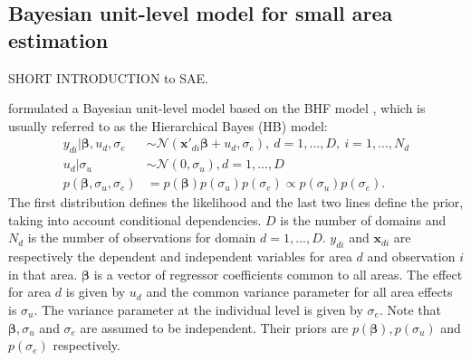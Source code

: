 \subsection{Bayesian unit-level model for small area estimation}

SHORT INTRODUCTION to SAE.    \cite{rao_small_2015}

\cite{molina_small_2014} formulated a Bayesian unit-level model based on the BHF model \citep{battese_error_1988}, which is usually referred to as the Hierarchical Bayes (HB) model:
\begin{equation}
    \label{eq:hb_rao}
	\begin{split}
	y_{di} |\boldsymbol \beta, u_d, \sigma_e & \sim \mathcal N(\boldsymbol{x'}_{di} \boldsymbol{\beta}+ u_d, \sigma_e),\ d = 1, ..., D,\ i = 1, ..., N_d \\
	u_d | \sigma_u & \sim \mathcal N(0, \sigma_u), d = 1, ..., D \\
	p(\boldsymbol \beta, \sigma_u, \sigma_e) & = p(\boldsymbol \beta) p(\sigma_u)p(\sigma_e) \propto p(\sigma_u)p(\sigma_e).
	\end{split}
\end{equation}
The first distribution defines the likelihood and the last two lines define the prior, taking into account conditional dependencies.
$D$ is the number of domains and $N_d$ is the number of observations for domain $d = 1, ..., D$. $y_{di}$ and $\boldsymbol{x}_{di}$ are respectively the dependent and independent variables for area $d$ and observation $i$ in that area.
$\boldsymbol \beta$ is a vector of regressor coefficients common to all areas.
The effect for area $d$ is given by $u_d$ and the common variance parameter for all area effects is $\sigma_u$.
The variance parameter at the individual level is given by $\sigma_e$.
Note that $\boldsymbol \beta, \sigma_u$ and $\sigma_e$ are assumed to be independent.
Their priors are $p(\boldsymbol \beta), p(\sigma_u)$ and $p(\sigma_e)$ respectively.



